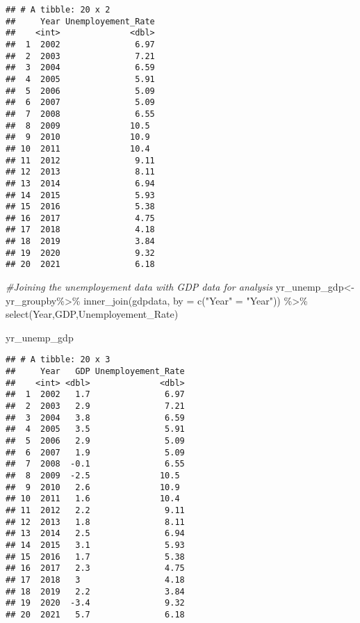 \documentclass[
]{article}
\newenvironment{Shaded}{\begin{snugshade}}{\end{snugshade}}
\newcommand{\AttributeTok}[1]{\textcolor[rgb]{0.77,0.63,0.00}{#1}}
\newcommand{\CommentTok}[1]{\textcolor[rgb]{0.56,0.35,0.01}{\textit{#1}}}
\newcommand{\FunctionTok}[1]{\textcolor[rgb]{0.00,0.00,0.00}{#1}}
\newcommand{\NormalTok}[1]{#1}
\newcommand{\OtherTok}[1]{\textcolor[rgb]{0.56,0.35,0.01}{#1}}
\newcommand{\SpecialCharTok}[1]{\textcolor[rgb]{0.00,0.00,0.00}{#1}}
\newcommand{\StringTok}[1]{\textcolor[rgb]{0.31,0.60,0.02}{#1}}
\begin{document}
\begin{verbatim}
## # A tibble: 20 x 2
##     Year Unemployement_Rate
##    <int>              <dbl>
##  1  2002               6.97
##  2  2003               7.21
##  3  2004               6.59
##  4  2005               5.91
##  5  2006               5.09
##  6  2007               5.09
##  7  2008               6.55
##  8  2009              10.5 
##  9  2010              10.9 
## 10  2011              10.4 
## 11  2012               9.11
## 12  2013               8.11
## 13  2014               6.94
## 14  2015               5.93
## 15  2016               5.38
## 16  2017               4.75
## 17  2018               4.18
## 18  2019               3.84
## 19  2020               9.32
## 20  2021               6.18
\end{verbatim}

\begin{Shaded}
\begin{Highlighting}[]
\CommentTok{\#Joining the unemployement data with GDP data for analysis}
\NormalTok{yr\_unemp\_gdp}\OtherTok{\textless{}{-}}\NormalTok{yr\_groupby}\SpecialCharTok{\%\textgreater{}\%}
  \FunctionTok{inner\_join}\NormalTok{(gdpdata, }\AttributeTok{by =} \FunctionTok{c}\NormalTok{(}\StringTok{"Year"} \OtherTok{=} \StringTok{"Year"}\NormalTok{)) }\SpecialCharTok{\%\textgreater{}\%} 
  \FunctionTok{select}\NormalTok{(Year,GDP,Unemployement\_Rate)}

\NormalTok{yr\_unemp\_gdp}
\end{Highlighting}
\end{Shaded}

\begin{verbatim}
## # A tibble: 20 x 3
##     Year   GDP Unemployement_Rate
##    <int> <dbl>              <dbl>
##  1  2002   1.7               6.97
##  2  2003   2.9               7.21
##  3  2004   3.8               6.59
##  4  2005   3.5               5.91
##  5  2006   2.9               5.09
##  6  2007   1.9               5.09
##  7  2008  -0.1               6.55
##  8  2009  -2.5              10.5 
##  9  2010   2.6              10.9 
## 10  2011   1.6              10.4 
## 11  2012   2.2               9.11
## 12  2013   1.8               8.11
## 13  2014   2.5               6.94
## 14  2015   3.1               5.93
## 15  2016   1.7               5.38
## 16  2017   2.3               4.75
## 17  2018   3                 4.18
## 18  2019   2.2               3.84
## 19  2020  -3.4               9.32
## 20  2021   5.7               6.18
\end{verbatim}
\end{document}
